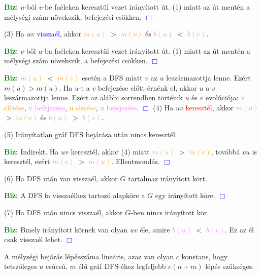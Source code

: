 \documentclass[../../szobeli.tex]{subfiles}
\begin{document}
\begin{itemize}
        \textcolor{green}{\textbf{Biz:}} $u$-ból $v$-be faéleken keresztül vezet irányított út. (1) miatt az út mentén a mélységi szám növekszik, befejezési csökken.  \textcolor{blue}{$\Box$}

        (3) Ha $uv$ \textcolor{blue}{visszaél}, akkor \textcolor{orange}{$m(u)$} $>$ \textcolor{orange}{$m(v)$} és \textcolor{violet}{$b(u)$} $<$ \textcolor{violet}{$b(v)$}.

        \textcolor{green}{\textbf{Biz:}} $v$-ből $u$-ba faéleken keresztül vezet irányított út. (1) miatt az út mentén a mélységi szám növekszik, a befejezési csökken.  \textcolor{blue}{$\Box$}

        \textcolor{green}{\textbf{Biz:}} \textcolor{orange}{$m(u)$} $<$ \textcolor{orange}{$m(v)$} esetén a DFS miatt $v$ az $u$ leszármazottja lenne. Ezért $m(u) > m(u)$. Ha $u$-t a $v$ befejezése előtt érnénk el, akkor $u$ a $v$ leszármazottja lenne. Ezért az alábbi sorrendben történik $u$ és $v$ evolúciója: \textcolor{orange}{v elérése}, \textcolor{violet}{v befejezése}, \textcolor{orange}{u elérése}, \textcolor{violet}{u befejezése}.  \textcolor{blue}{$\Box$}
        (4) Ha $uv$ \textcolor{red}{keresztél}, akkor \textcolor{orange}{$m(u)$} $>$ \textcolor{orange}{$m(v)$} és \textcolor{violet}{$b(u)$} $>$ \textcolor{violet}{$b(v)$}.

        (5) Irányítatlan gráf DFS bejárása után nincs keresztél.

        \textcolor{green}{\textbf{Biz:}} Indirekt. Ha $uv$ keresztél, akkor (4) miatt \textcolor{orange}{$m(u)$} $>$ \textcolor{orange}{$m(v)$}, továbbá $vu$ is keresztél, ezért \textcolor{orange}{$m(v)$} $>$ \textcolor{orange}{$m(u)$}. Ellentmondás.  \textcolor{blue}{$\Box$}

        (6) Ha DFS után van visszaél, akkor $G$ tartalmaz irányított kört.

        \textcolor{green}{\textbf{Biz:}} A DFS fa visszaélhez tartozó alapköre a $G$ egy irányított köre.  \textcolor{blue}{$\Box$}

        (7) Ha DFS után nincs visszaél, akkor $G$-ben nincs irányított kör.

        \textcolor{green}{\textbf{Biz:}} Bmely irányított körnek van olyan $uv$ éle, amire \textcolor{violet}{$b(u)$} $<$ \textcolor{violet}{$b(v)$}. Ez az él csak visszaél lehet.  \textcolor{blue}{$\Box$} 

        A mélységi bejárás lépésszáma lineáris, azaz van olyan $c$ konstans, hogy tetszőleges $u$ csúcsú, $m$ élű gráf DFS-éhez legfeljebb $c(n+m)$ lépés szükséges.
    

\end{itemize}
\end{document}
